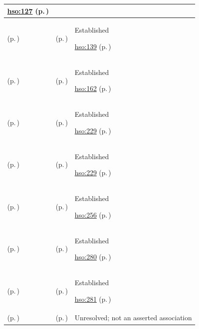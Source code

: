 \begin{longtable}{|>{\raggedright\arraybackslash}p{0.27\TableWidth}|>{\raggedright\arraybackslash}p{0.27\TableWidth}|>{\raggedright\arraybackslash}p{0.46\TableWidth}|}
 \hyperref[rad:hso:121]{hso:127} (p.\,\pageref{rad:hso:121})\\\hline
\nameref{function:manage-outpatient-capacity} (p.\,\pageref{function:manage-outpatient-capacity}) & \nameref{feature:feat-hso-09} (p.\,\pageref{feature:feat-hso-09}) & Established

 \hyperref[rad:hso:134]{hso:139} (p.\,\pageref{rad:hso:134})\\\hline
\nameref{function:manage-bed-turnover-progression} (p.\,\pageref{function:manage-bed-turnover-progression}) & \nameref{feature:feat-hso-13} (p.\,\pageref{feature:feat-hso-13}) & Established

 \hyperref[rad:hso:151]{hso:162} (p.\,\pageref{rad:hso:151})\\\hline
\nameref{function:dispatch-operational-work-order} (p.\,\pageref{function:dispatch-operational-work-order}) & \nameref{feature:feat-hso-20} (p.\,\pageref{feature:feat-hso-20}) & Established

 \hyperref[rad:hso:221]{hso:229} (p.\,\pageref{rad:hso:221})\\\hline
\nameref{function:dispatch-operational-work-order} (p.\,\pageref{function:dispatch-operational-work-order}) & \nameref{feature:feat-hso-21} (p.\,\pageref{feature:feat-hso-21}) & Established

 \hyperref[rad:hso:221]{hso:229} (p.\,\pageref{rad:hso:221})\\\hline
\nameref{function:manage-patient-transport-progression} (p.\,\pageref{function:manage-patient-transport-progression}) & \nameref{feature:feat-hso-24} (p.\,\pageref{feature:feat-hso-24}) & Established

 \hyperref[rad:hso:250]{hso:256} (p.\,\pageref{rad:hso:250})\\\hline
\nameref{function:manage-discharge-coordination-progression} (p.\,\pageref{function:manage-discharge-coordination-progression}) & \nameref{feature:feat-hso-27} (p.\,\pageref{feature:feat-hso-27}) & Established

 \hyperref[rad:hso:275]{hso:280} (p.\,\pageref{rad:hso:275})\\\hline
\nameref{function:manage-discharge-coordination-progression} (p.\,\pageref{function:manage-discharge-coordination-progression}) & \nameref{feature:feat-hso-29} (p.\,\pageref{feature:feat-hso-29}) & Established

 \hyperref[rad:hso:275]{hso:281} (p.\,\pageref{rad:hso:275})\\\hline
\nameref{function:coordinate-multi-agency-chronic-care-plan} (p.\,\pageref{function:coordinate-multi-agency-chronic-care-plan}) & \nameref{feature:feat-sd-02} (p.\,\pageref{feature:feat-sd-02}) & Unresolved; not an asserted association


\end{longtable}
